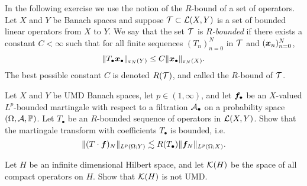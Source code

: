 In the following exercise we use the notion of the $R$-bound of a set of operators.
Let $X$ and $Y$ be Banach spaces and suppose $\mathcal{T} \subset \mathcal{L}(X,Y)$ is a set of bounded linear operators from $X$ to $Y$.
We say that the set $\mathcal{T}$ is \emph{$R$-bounded} if there exists a constant $C < \infty$ such that for all finite sequences $(T_{n})_{n=0}^{N}$ in $\mathcal{T}$ and $(\bm{x}_{n})_{n=0}^{N}$,
\begin{equation*}
  \|T_{\bullet} \bm{x}_{\bullet}\|_{\varepsilon_{N}(Y)} \leq C \|\bm{x}_{\bullet}\|_{\varepsilon_{N}(X)}.
\end{equation*}
The best possible constant $C$ is denoted $R(\mathcal{T})$, and called the $R$-bound of $\mathcal{T}$.

\begin{exercise}\label{ex:R-bd-mgale-tf}
  Let $X$ and $Y$ be UMD Banach spaces, let $p \in (1,\infty)$, and let $\bm{f}_{\bullet}$ be an $X$-valued $L^p$-bounded martingale with respect to a filtration $\mathcal{A}_{\bullet}$ on a probability space $(\Omega,\mathcal{A},\mathbb{P})$.
  Let $T_{\bullet}$ be an $R$-bounded sequence of operators in $\mathcal{L}(X,Y)$.
  Show that the martingale transform with coefficients $T_{\bullet}$ is bounded, i.e.
  \begin{equation*}
    \| (T \cdot \bm{f})_{N} \|_{L^p(\Omega;Y)} \lesssim R(T_{\bullet}) \|\bm{f}_{N}\|_{L^p(\Omega;X)}.
  \end{equation*}
\end{exercise}

\begin{exercise}
  Let $H$ be an infinite dimensional Hilbert space, and let $\mathcal{K}(H)$ be the space of all compact operators on $H$.
  Show that $\mathcal{K}(H)$ is not UMD.
\end{exercise}





